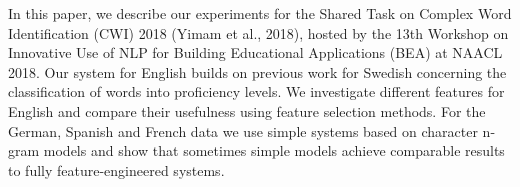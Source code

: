 In this paper, we describe our experiments for the Shared Task on Complex Word Identification (CWI) 2018 (Yimam et al., 2018), hosted by the 13th Workshop on Innovative Use of NLP for Building Educational Applications (BEA) at NAACL 2018. Our system for English builds on previous work for Swedish concerning the classification of words into proficiency levels. We investigate different features for English and compare their usefulness using feature selection methods. For the German, Spanish and French data we use simple systems based on character n-gram models and show that sometimes simple models achieve comparable results to fully feature-engineered systems.

